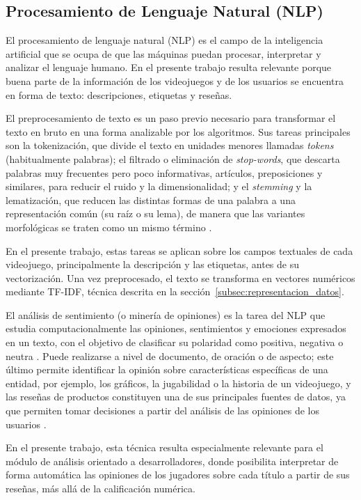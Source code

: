 \subsection{Procesamiento de Lenguaje Natural (NLP)}\label{subsec:nlp}

El procesamiento de lenguaje natural (NLP) es el campo de la inteligencia artificial que se ocupa de que las máquinas puedan procesar, interpretar y analizar el lenguaje humano. En el presente trabajo resulta relevante porque buena parte de la información de los videojuegos y de los usuarios se encuentra en forma de texto: descripciones, etiquetas y reseñas.

El preprocesamiento de texto es un paso previo necesario para transformar el texto en bruto en una forma analizable por los algoritmos. Sus tareas principales son la tokenización, que divide el texto en unidades menores llamadas \emph{tokens} (habitualmente palabras); el filtrado o eliminación de \emph{stop-words}, que descarta palabras muy frecuentes pero poco informativas, artículos, preposiciones y similares, para reducir el ruido y la dimensionalidad; y el \emph{stemming} y la lematización, que reducen las distintas formas de una palabra a una representación común (su raíz o su lema), de manera que las variantes morfológicas se traten como un mismo término \parencite{AlObaydyEtAl2022, LabdEtAl2024}.

En el presente trabajo, estas tareas se aplican sobre los campos textuales de cada videojuego, principalmente la descripción y las etiquetas, antes de su vectorización. Una vez preprocesado, el texto se transforma en vectores numéricos mediante TF-IDF, técnica descrita en la sección~\ref{subsec:representacion_datos}.

El análisis de sentimiento (o minería de opiniones) es la tarea del NLP que estudia computacionalmente las opiniones, sentimientos y emociones expresados en un texto, con el objetivo de clasificar su polaridad como positiva, negativa o neutra \parencite{MedhatEtAl2014}. Puede realizarse a nivel de documento, de oración o de aspecto; este último permite identificar la opinión sobre características específicas de una entidad, por ejemplo, los gráficos, la jugabilidad o la historia de un videojuego, y las reseñas de productos constituyen una de sus principales fuentes de datos, ya que permiten tomar decisiones a partir del análisis de las opiniones de los usuarios \parencite{MedhatEtAl2014}.

En el presente trabajo, esta técnica resulta especialmente relevante para el módulo de análisis orientado a desarrolladores, donde posibilita interpretar de forma automática las opiniones de los jugadores sobre cada título a partir de sus reseñas, más allá de la calificación numérica.

